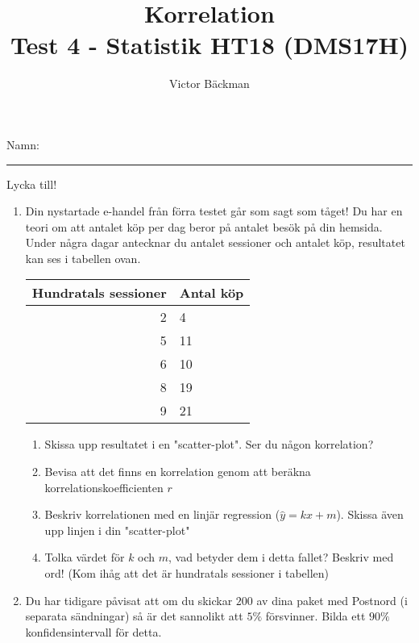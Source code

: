\documentclass[a4paper,10pt]{article}
\title{Korrelation \\ {\large Test 4 - Statistik HT18 (DMS17H)}}
\author{Victor Bäckman}
\begin{document}
\maketitle
\vspace{2cm}
Namn:
{\rule{13cm}{0.4pt}}
\vspace{8cm}
\begin{center}
  {\huge Lycka till!}
\end{center}
\newpage
\begin{enumerate}
    \item{Din nystartade e-handel från förra testet går som sagt som tåget! Du har en teori om att antalet köp per dag beror på antalet besök på din hemsida. Under några dagar antecknar du antalet sessioner och antalet köp, resultatet kan ses i tabellen ovan.
      \begin{table}
        \centering
        \begin{tabular}[H]{r|l}
        \textbf{Hundratals sessioner} & \textbf{Antal köp} \\ \hline
        2                            & 4                  \\
        5                            & 11                  \\
        6                            & 10                 \\
        8                            & 19                 \\
        9                            & 21
        \end{tabular}
    \end{table}
   }
    \begin{enumerate}
        \item{Skissa upp resultatet i en "scatter-plot". Ser du någon korrelation?}
        \newpage
        \item{Bevisa att det finns en korrelation genom att beräkna korrelationskoefficienten $r$}
        \newpage
        \item{Beskriv korrelationen med en linjär regression ($\hat{y}=kx+m$). Skissa även upp linjen i din "scatter-plot"}
        \newpage
      \item{Tolka värdet för $k$ och $m$, vad betyder dem i detta fallet? Beskriv med ord! (Kom ihåg att det är hundratals sessioner i tabellen)}
    \end{enumerate}
  \newpage
  \item{Du har tidigare påvisat att om du skickar $200$ av dina paket med Postnord (i separata sändningar) så är det sannolikt att $5\%$ försvinner. Bilda ett $90\%$ konfidensintervall för detta.}
\end{enumerate}
\end{document}
